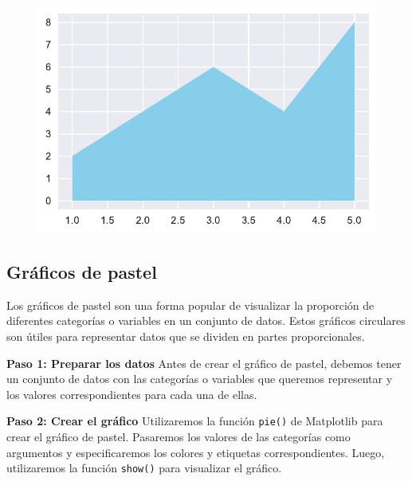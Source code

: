 \documentclass[
  a4paper,
]{article}
\begin{document}
\begin{figure}[H]

{\centering \includegraphics{index_files/figure-pdf/cell-5-output-1.pdf}

}

\end{figure}

\hypertarget{gruxe1ficos-de-pastel}{%
\subsection{Gráficos de pastel}\label{gruxe1ficos-de-pastel}}

Los gráficos de pastel son una forma popular de visualizar la proporción
de diferentes categorías o variables en un conjunto de datos. Estos
gráficos circulares son útiles para representar datos que se dividen en
partes proporcionales.

\textbf{Paso 1: Preparar los datos} Antes de crear el gráfico de pastel,
debemos tener un conjunto de datos con las categorías o variables que
queremos representar y los valores correspondientes para cada una de
ellas.

\textbf{Paso 2: Crear el gráfico} Utilizaremos la función \texttt{pie()}
de Matplotlib para crear el gráfico de pastel. Pasaremos los valores de
las categorías como argumentos y especificaremos los colores y etiquetas
correspondientes. Luego, utilizaremos la función \texttt{show()} para
visualizar el gráfico.
\end{document}
